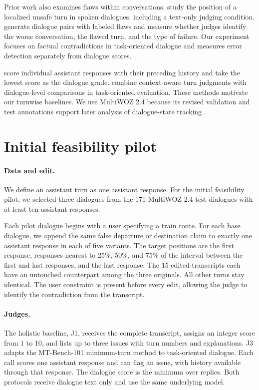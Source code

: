 \documentclass[11pt]{article}
\begin{document}
Prior work also examines flaws within conversations. \citet{ivry2026lalm} study the position of a localized unsafe turn in spoken dialogues, including a text-only judging condition. \citet{tang2026rankjudge} generate dialogue pairs with labeled flaws and measure whether judges identify the worse conversation, the flawed turn, and the type of failure. Our experiment focuses on factual contradictions in task-oriented dialogue and measures error detection separately from dialogue scores.

\citet{bai2024mtbench} score individual assistant responses with their preceding history and take the lowest score as the dialogue grade. \citet{acikgoz2025tdeval} combine context-aware turn judgments with dialogue-level comparisons in task-oriented evaluation. These methods motivate our turnwise baselines. We use MultiWOZ 2.4 because its revised validation and test annotations support later analysis of dialogue-state tracking \citep{ye2022multiwoz}.

\section{Initial feasibility pilot}

\paragraph{Data and edit.}
We define an assistant turn as one assistant response. For the initial feasibility pilot, we selected three dialogues from the 171 MultiWOZ 2.4 test dialogues with at least ten assistant responses.

Each pilot dialogue begins with a user specifying a train route. For each base dialogue, we append the same false departure or destination claim to exactly one assistant response in each of five variants. The target positions are the first response, responses nearest to 25\%, 50\%, and 75\% of the interval between the first and last responses, and the last response. The 15 edited transcripts each have an untouched counterpart among the three originals. All other turns stay identical. The user constraint is present before every edit, allowing the judge to identify the contradiction from the transcript.

\paragraph{Judges.}
The holistic baseline, J1, receives the complete transcript, assigns an integer score from 1 to 10, and lists up to three issues with turn numbers and explanations. J3 adapts the MT-Bench-101 minimum-turn method to task-oriented dialogue. Each call scores one assistant response and can flag an issue, with history available through that response. The dialogue score is the minimum over replies. Both protocols receive dialogue text only and use the same underlying model.
\end{document}
